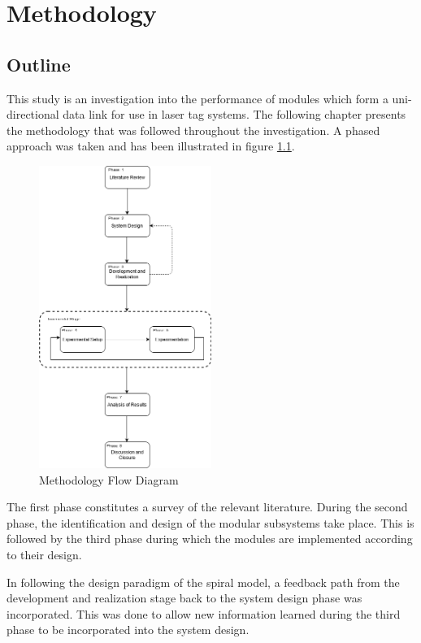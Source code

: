 \chapter{Methodology}
\label{ch_methodology}

\section{Outline}

This study is an investigation into the performance of modules which form a uni-directional data link for use in laser tag systems. The following chapter presents the methodology that was followed throughout the investigation. A phased approach was taken and has been illustrated in figure \ref{fig:methodology_overview}.

\begin{figure}[H]
	\centering
	\includegraphics[width=0.5\textwidth]{figures/methodology/methodology}
	\caption{Methodology Flow Diagram}
	\label{fig:methodology_overview}
\end{figure}

The first phase constitutes a survey of the relevant literature. During the second phase, the identification and design of the modular subsystems take place. This is followed by the third phase during which the modules are implemented according to their design.

In following the design paradigm of the spiral model, a feedback path from the development and realization stage back to the system design phase was incorporated. This was done to allow new information learned during the third phase to be incorporated into the system design.

